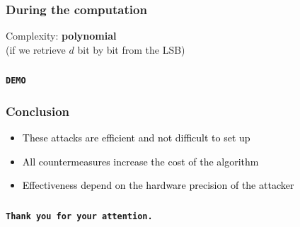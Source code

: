 \documentclass{beamer}
\begin{document}

    \begin{frame}
        \frametitle{During the computation}
        Complexity: {\bf polynomial}\\

        (if we retrieve $d$ bit by bit from the LSB)

    \end{frame}

    \begin{frame}
        \frametitle{}
        \begin{center}
            {\Huge\bf\tt DEMO}
        \end{center}
    \end{frame}

\begin{frame}
    \frametitle{Conclusion}

    \begin{itemize}
        \item \textcolor{black}{These attacks are efficient and not difficult to set up}
        \item \textcolor{black}{All countermeasures increase the cost of the algorithm}
	\item \textcolor{black}{Effectiveness depend on the hardware precision of the attacker}
    \end{itemize}

\end{frame}


\begin{frame}
    \frametitle{}
    \begin{center}
        {\Huge\bf\tt Thank you for your attention.}
    \end{center}
\end{frame}
\end{document}
